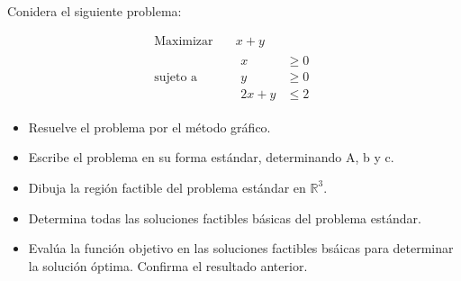 \documentclass{article}
\begin{document}
Conidera el siguiente problema:

\begin{equation*}
  \begin{aligned}
    \text{Maximizar}\quad & x+y \\
    \text{sujeto a}\quad &
    \begin{aligned}
      x & \geq 0\\
      y & \geq 0\\
      2x+y & \leq 2
    \end{aligned}
  \end{aligned}
\end{equation*}

\begin{itemize}
\item Resuelve el problema por el método gráfico.
\item Escribe el problema en su forma estándar, determinando A, b y c.
\item Dibuja la región factible del problema estándar en $\mathbb{R}^3$.
\item Determina todas las soluciones factibles básicas del problema estándar.
\item Evalúa la función objetivo en las soluciones factibles bsáicas para determinar la solución óptima. Confirma el resultado anterior.
\end{itemize}
\end{document}
